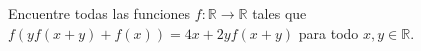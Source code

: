 Encuentre todas las funciones $f:\mathbb{R}\to\mathbb{R}$ tales que $f\left( {yf(x + y) + f(x)} \right) = 4x + 2yf(x + y)$ para todo $x,y\in\mathbb{R}$.